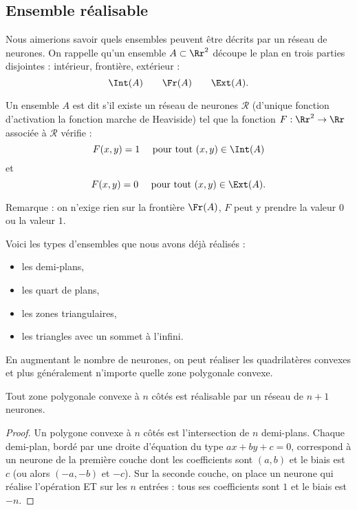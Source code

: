 \documentclass[11pt,class=report,crop=false]{standalone}
\begin{document}
\subsection{Ensemble réalisable}

Nous aimerions savoir quels ensembles peuvent être décrits par un réseau de neurones.
On rappelle qu'un ensemble $A \subset \Rr^2$ découpe le plan en trois parties disjointes : intérieur, frontière, extérieur :
$$\Int(A) \qquad \Fr(A) \qquad \Ext(A).$$


\begin{definition}
Un ensemble $A$ est dit  s'il existe un réseau de neurones $\mathcal{R}$ (d'unique fonction d'activation la fonction marche de Heaviside) tel que
la fonction $F : \Rr^2 \to \Rr$ associée à $\mathcal{R}$ vérifie :
$$F(x,y) = 1 \quad \text{ pour tout } (x,y) \in \Int(A)$$
et
$$F(x,y) = 0 \quad \text{ pour tout } (x,y) \in \Ext(A).$$
\end{definition}



Remarque : on n'exige rien sur la frontière $\Fr(A)$, $F$ peut y prendre la valeur $0$ ou la valeur $1$.


Voici les types d'ensembles que nous avons déjà réalisés :
\begin{itemize}
  \item les demi-plans,
  \item les \og{}quart de plans\fg{},
  \item les zones triangulaires,
  \item les triangles avec un sommet \og{}à l'infini\fg{}.
\end{itemize}



En augmentant le nombre de neurones, on peut réaliser les quadrilatères convexes et plus généralement n'importe quelle zone polygonale convexe.

\begin{proposition}
Tout zone polygonale convexe à $n$ côtés est réalisable par un réseau de $n+1$ neurones.
\end{proposition}


\begin{proof}
Un polygone convexe à $n$ côtés est l'intersection de $n$ demi-plans.
Chaque demi-plan, bordé par une droite d'équation du type $ax+by+c=0$, correspond à un neurone de la première couche dont les coefficients sont $(a,b)$ et le biais est $c$ (ou alors $(-a,-b)$ et $-c$).
Sur la seconde couche, on place un neurone qui réalise l'opération \og{}ET\fg{} sur les $n$ entrées : tous ses coefficients sont $1$ et le biais est $-n$.
\end{proof}
\end{document}
